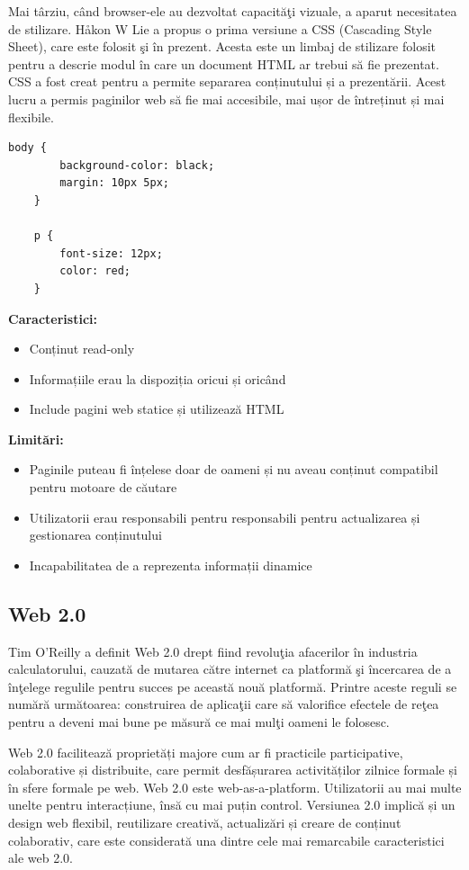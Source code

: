 \documentclass[12pt, a4paper]{report}
\begin{document}
Mai t\^ arziu, c\^ and browser-ele au dezvoltat capacit\u a\c ti vizuale, a aparut necesitatea de stilizare. Håkon W Lie a propus o prima versiune a CSS (Cascading Style Sheet), care este folosit \c si \^ in prezent. Acesta este un limbaj de stilizare folosit pentru a descrie modul \^ in care un document HTML ar trebui să fie prezentat. CSS a fost creat pentru a permite separarea conținutului și a prezentării. Acest lucru a permis paginilor web să fie mai accesibile, mai ușor de întreținut și mai flexibile.
\begin{lstlisting}[caption={Exemplu fi\c sier CSS},captionpos=b]
	body {
		background-color: black;
		margin: 10px 5px;
	}

	p {
		font-size: 12px;
		color: red;
	}
\end{lstlisting}

\textbf{Caracteristici:}
\begin{itemize}
	\item Conținut read-only
	\item Informațiile erau la dispoziția oricui și oricând
	\item Include pagini web statice și utilizează HTML
\end{itemize}

\textbf{Limitări:}
\begin{itemize}
	\item Paginile puteau fi înțelese doar de oameni și nu aveau conținut compatibil pentru motoare de căutare
	\item Utilizatorii erau responsabili pentru responsabili pentru actualizarea și gestionarea conținutului
	\item Incapabilitatea de a reprezenta informații dinamice
\end{itemize}

\subsection{Web 2.0}

Tim O'Reilly a definit Web 2.0 drept fiind revolu\c tia afacerilor \^ in industria calculatorului, cauzat\u a de mutarea c\u atre internet ca platform\u a \c si \^ incercarea de a \^ in\c telege regulile pentru succes pe aceast\u a nou\u a platform\u a. Printre aceste reguli se num\u ar\u a urm\u atoarea: construirea de aplica\c tii care s\u a valorifice efectele de re\c tea pentru a deveni mai bune pe m\u asur\u a ce mai mul\c ti oameni le folosesc. \cite{oreilly}

Web 2.0 facilitează proprietăți majore cum ar fi practicile participative, colaborative și distribuite, care permit desfășurarea activităților zilnice formale și în sfere formale pe web. Web 2.0 este web-as-a-platform. Utilizatorii au mai multe unelte pentru interacțiune, însă cu mai puțin control. Versiunea 2.0 implică și un design web flexibil, reutilizare creativă, actualizări și creare de conținut colaborativ, care este considerată una dintre cele mai remarcabile caracteristici ale web 2.0.
\end{document}
